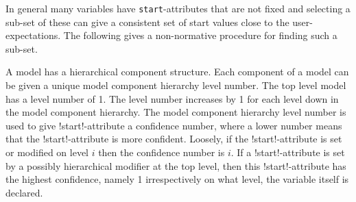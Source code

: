 In general many variables have \lstinline!start!-attributes that are not fixed and selecting a sub-set of these can give a consistent set of start values close to the user-expectations.
The following gives a non-normative procedure for finding such a sub-set.

\begin{nonnormative}
A model has a hierarchical component structure.
Each component of a model can be given a unique model component hierarchy level number.
The top level model has a level number of 1.
The level number increases by 1 for each level down in the model component hierarchy.
The model component hierarchy level number is used to give \lstinlin!start!-attribute a confidence number, where a lower number means that the \lstinlin!start!-attribute is more confident.
Loosely, if the \lstinlin!start!-attribute is set or modified on level $i$ then the confidence number is $i$.
If a \lstinlin!start!-attribute is set by a possibly hierarchical modifier at the top level, then this \lstinlin!start!-attribute has the highest confidence, namely 1 irrespectively on what level, the variable itself is declared.
\end{nonnormative}
